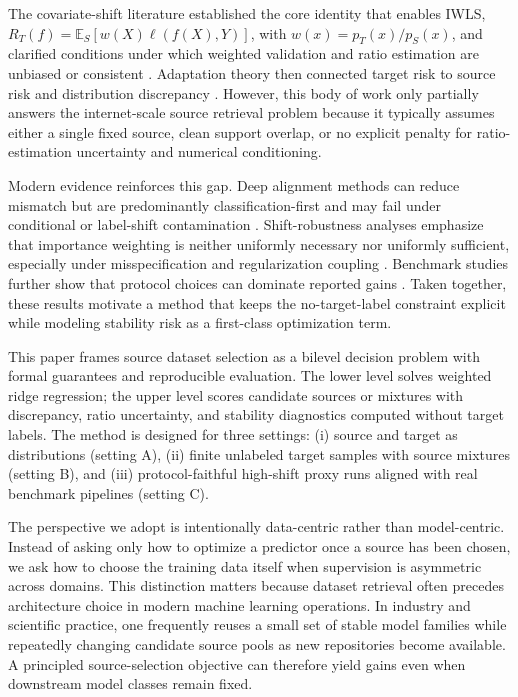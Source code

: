 \documentclass{article} %
\begin{document}
The covariate-shift literature established the core identity that enables IWLS,
\(R_T(f)=\mathbb{E}_{S}[w(X)\ell(f(X),Y)]\), with \(w(x)=p_T(x)/p_S(x)\), and clarified conditions under which weighted validation and ratio estimation are unbiased or consistent \citep{Sugiyama2007IWCV,Sugiyama2007KLIEP,Huang2006KMM,Sugiyama2012DensityRatioBook}. Adaptation theory then connected target risk to source risk and distribution discrepancy \citep{BenDavid2010Theory,Mansour2009Discrepancy,Mansour2010Renyi,Zhang2019MDD}. However, this body of work only partially answers the internet-scale source retrieval problem because it typically assumes either a single fixed source, clean support overlap, or no explicit penalty for ratio-estimation uncertainty and numerical conditioning.

Modern evidence reinforces this gap. Deep alignment methods can reduce mismatch but are predominantly classification-first and may fail under conditional or label-shift contamination \citep{Ganin2016DANN,Long2018CDAN,Sun2016DeepCORAL,Long2015DAN,Tzeng2017ADDA,Saito2018MCD,Combes2020ConditionalShift}. Shift-robustness analyses emphasize that importance weighting is neither uniformly necessary nor uniformly sufficient, especially under misspecification and regularization coupling \citep{Gogolashvili2023NeedIW,Kanagawa2023Regularization,Feng2024Quantile}. Benchmark studies further show that protocol choices can dominate reported gains \citep{Ragab2023AdaTime,Fawaz2023Benchmark,Koh2021WILDS,Zhao2023TTAPitfalls}. Taken together, these results motivate a method that keeps the no-target-label constraint explicit while modeling stability risk as a first-class optimization term.

This paper frames source dataset selection as a bilevel decision problem with formal guarantees and reproducible evaluation. The lower level solves weighted ridge regression; the upper level scores candidate sources or mixtures with discrepancy, ratio uncertainty, and stability diagnostics computed without target labels. The method is designed for three settings: (i) source and target as distributions (setting A), (ii) finite unlabeled target samples with source mixtures (setting B), and (iii) protocol-faithful high-shift proxy runs aligned with real benchmark pipelines (setting C).

The perspective we adopt is intentionally data-centric rather than model-centric. Instead of asking only how to optimize a predictor once a source has been chosen, we ask how to choose the training data itself when supervision is asymmetric across domains. This distinction matters because dataset retrieval often precedes architecture choice in modern machine learning operations. In industry and scientific practice, one frequently reuses a small set of stable model families while repeatedly changing candidate source pools as new repositories become available. A principled source-selection objective can therefore yield gains even when downstream model classes remain fixed.
\end{document}
